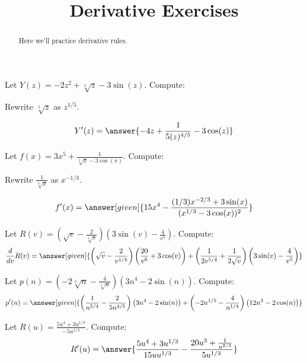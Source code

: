 \documentclass[handout]{ximera}
\title{Derivative Exercises}
\begin{document}
\begin{abstract}
  Here we'll practice derivative rules.
\end{abstract}
\maketitle

\begin{exercise}
Let $Y(z) = -2 z^2 + \sqrt[5]{z} -3 \sin (z)$. Compute:

\begin{hint}
Rewrite $\sqrt[5]{z}$ as $z^{1/5}$.
\end{hint}

\[
Y'(z)
=\answer{-4z+\frac{1}{5 (z)^{4/5}}-3 \cos(z)}
\]
\end{exercise}


\begin{exercise}
Let $f(x) = 3x^5+\frac{1}{\sqrt[3]{x}-3 \cos (x)}$. Compute:

\begin{hint}
Rewrite $\frac{1}{\sqrt[3]{x}}$ as $x^{-1/3}$.
\end{hint}
\[
f'(x)
=\answer[given]{15x^4-\frac{(1/3)x^{-2/3} + 3\sin(x)}{(x^{1/3} - 3\cos(x))^2}}
\]
\end{exercise}

\begin{exercise}
Let $R(v) = \left(\sqrt{v}-\frac{2}{\sqrt[4]{v}}\right) \left(3 \sin (v)-\frac{4}{v^5}\right)$. Compute:
\[
\dd{v}R(v)
=\answer[given]{\left(\sqrt{v}-\frac{2}{{v}^{1/4}}\right) \left(\frac{20}{v^6}+3 \cos (v)\right) + \left(\frac{1}{2 {v}^{5/4}}+\frac{1}{2 \sqrt{v}}\right) \left(3 \sin (v)-\frac{4}{v^5}\right)}
\]
\end{exercise}

\begin{exercise}
Let $p(n) = \left(-2 \sqrt[5]{n}-\frac{4}{\sqrt[4]{n}}\right) \left(3 n^4-2 \sin (n)\right)$. Compute:
\[
p'(n)
=\answer[given]{\left(\frac{1}{{n}^{5/4}}-\frac{2}{5 {n}^{4/5}}\right) \left(3 n^4 - 2 \sin (n)\right)+\left(-2 {n}^{1/5}-\frac{4}{{n}^{1/4}}\right) \left(12 n^3 - 2 \cos (n)\right)}
\]
\end{exercise}

\begin{exercise}
Let $R(u) = \frac{5 u^4+3 {u}^{1/3}}{-5 {u}^{1/3}}$. Compute:
\[
R'(u)
=\answer{\frac{5 u^4 + 3 {u}^{1/3}}{15 u {u}^{1/3}}-\frac{20 u^3+\frac{1}{{u}^{2/3}}}{5 {u}^{1/3}}}
\]
\end{exercise}
\end{document}
